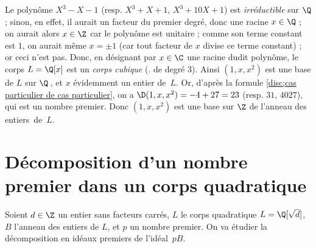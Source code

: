 \documentclass[11pt, %
  title in boldface,
  theorem in new line,
  theorem numbering = section,
  number theorems separately,
  simple name,
]{beaulivre}
\begin{document}
        \begin{example}
            Le polynôme \( X^3-X-1 \) (resp. \( X^3+X+1 \), \( X^3+10X+1 \)) est \emph{irréductible} sur \( \Q \) ; sinon, en effet, il aurait un facteur du premier degré, donc une racine \( x \in \Q \) ; on aurait alors \( x \in \Z \) car le polynôme est unitaire ; comme son terme constant est \( 1 \), on aurait même \( x = \pm 1 \) (car tout facteur de \( x \) divise ce terme constant) ; or ceci n'est pas. Donc, en désignant par \( x \in \C \) une racine dudit polynôme, le corps \( L = \Q[x] \) est un \emph{corps cubique} (\ie. de degré \( 3 \)). Ainsi \( (1, x, x^2) \) est une base de \( L \) sur \( \Q \)\,, et \( x \) évidemment un entier de~\( L \). Or, d'après la formule \eqref{disc;cas particulier de cas particulier}, on a \( \D(1,x,x^2) = -4+27 = 23 \) (resp. \( 31 \), \( 4027 \)), qui est un nombre premier. Donc \( (1, x, x^2) \) est une base sur \( \Z \) de l'anneau des entiers~de~\( L \).
        \end{example}

\section{Décomposition d'un nombre premier dans un corps quadratique}\label{sec:décomposition d'un nombre premier dans un corps quadratique}

    Soient \( d \in \Z \) un entier sans facteurs carrés, \( L \) le corps quadratique \( L = \Q[\sqrt{d}] \), \( B \) l'anneau des entiers de \( L \), et \( p \) un nombre premier. On va étudier la décomposition en idéaux premiers de l'idéal~\( pB \).
\end{document}
